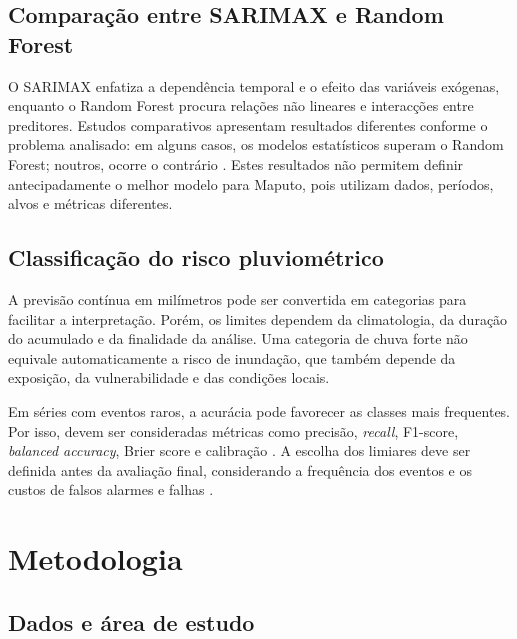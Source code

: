 \documentclass[9pt,twocolumn,twoside,english,portuguese]{opticajnl}
\begin{document}
\subsection{Comparação entre SARIMAX e Random Forest}

O SARIMAX enfatiza a dependência temporal e o efeito das variáveis exógenas,
enquanto o Random Forest procura relações não lineares e interacções entre
preditores. Estudos comparativos apresentam resultados diferentes conforme o
problema analisado: em alguns casos, os modelos estatísticos superam o
Random Forest; noutros, ocorre o contrário
\cite{TihiPopov2024ARIMARF,Khan2024Rainfall}. Estes resultados não permitem
definir antecipadamente o melhor modelo para Maputo, pois utilizam dados,
períodos, alvos e métricas diferentes.

\subsection{Classificação do risco pluviométrico}

A previsão contínua em milímetros pode ser convertida em categorias para
facilitar a interpretação. Porém, os limites dependem da climatologia, da
duração do acumulado e da finalidade da análise. Uma categoria de chuva forte
não equivale automaticamente a risco de inundação, que também depende da
exposição, da vulnerabilidade e das condições locais.

Em séries com eventos raros, a acurácia pode favorecer as classes mais
frequentes. Por isso, devem ser consideradas métricas como precisão,
\textit{recall}, F1-score, \textit{balanced accuracy}, Brier score e
calibração \cite{Casati2008ForecastVerification}. A escolha dos limiares
deve ser definida antes da avaliação final, considerando a frequência dos
eventos e os custos de falsos alarmes e falhas
\cite{Bouttier2024RiskThresholds}.
























\section{Metodologia}
\subsection{Dados e área de estudo}
\end{document}
